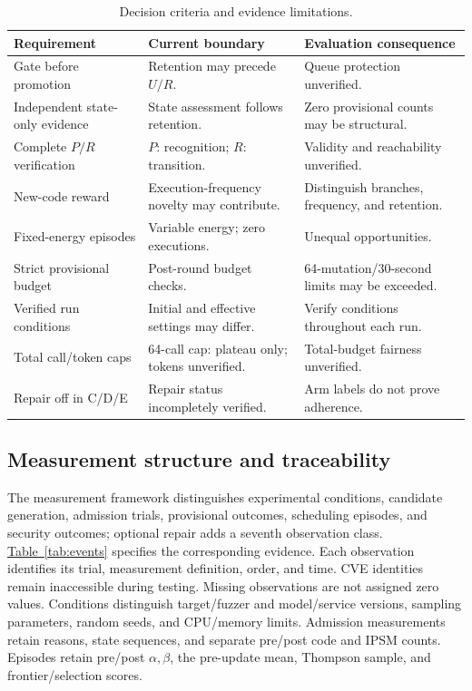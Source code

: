 \documentclass[final,5p,times,number]{elsarticle}
\newcommand{\namedref}[2]{\hyperref[#2]{#1~\ref*{#2}}}
\begin{document}
\begin{table}[!tbp]
\centering\small
\caption{Decision criteria and evidence limitations.}
\label{tab:implementation}
\begin{tabularx}{\textwidth}{Y Y Y}
\toprule
Requirement & Current boundary & Evaluation consequence \\
\midrule
Gate before promotion & Retention may precede $U/R$. & Queue protection unverified. \\
Independent state-only evidence & State assessment follows retention. & Zero provisional counts may be structural. \\
Complete $P/R$ verification & $P$: recognition; $R$: transition. & Validity and reachability unverified. \\
New-code reward & Execution-frequency novelty may contribute. & Distinguish branches, frequency, and retention. \\
Fixed-energy episodes & Variable energy; zero executions. & Unequal opportunities. \\
Strict provisional budget & Post-round budget checks. & 64-mutation/30-second limits may be exceeded. \\
Verified run conditions & Initial and effective settings may differ. & Verify conditions throughout each run. \\
Total call/token caps & 64-call cap: plateau only; tokens unverified. & Total-budget fairness unverified. \\
Repair off in C/D/E & Repair status incompletely verified. & Arm labels do not prove adherence. \\
\bottomrule
\end{tabularx}
\end{table}

\subsection{Measurement structure and traceability}
The measurement framework distinguishes experimental conditions, candidate generation, admission trials, provisional outcomes, scheduling episodes, and security outcomes; optional repair adds a seventh observation class. \namedref{Table}{tab:events} specifies the corresponding evidence. Each observation identifies its trial, measurement definition, order, and time. CVE identities remain inaccessible during testing. Missing observations are not assigned zero values. Conditions distinguish target/fuzzer and model/service versions, sampling parameters, random seeds, and CPU/memory limits. Admission measurements retain reasons, state sequences, and separate pre/post code and IPSM counts. Episodes retain pre/post $\alpha,\beta$, the pre-update mean, Thompson sample, and frontier/selection scores.
\end{document}
